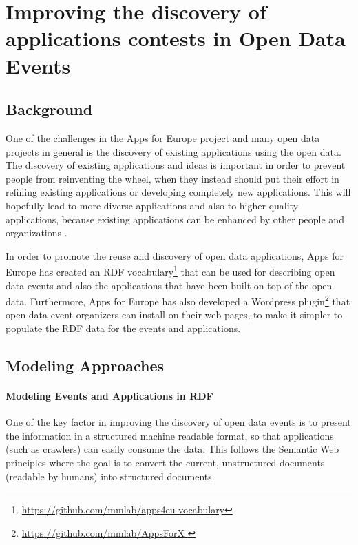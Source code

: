 \section{Improving the discovery of applications contests in Open Data Events}
\label{sec:contests}

\subsection{Background}
\label{sec:backcontest}
One of the challenges in the Apps for Europe project and many open data projects in general is the discovery of existing applications using the open data. The discovery of existing applications and ideas is important in order to prevent people from reinventing the wheel, when they instead should put their effort in refining existing applications or developing completely new applications. This will hopefully lead to more diverse applications and also to higher quality applications, because existing applications can be enhanced by other people and organizations \cite{apps4eu}.

In order to promote the reuse and discovery of open data applications, Apps for Europe has created an RDF vocabulary\footnote{\url{https://github.com/mmlab/apps4eu-vocabulary}}  that can be used for describing open data events and also the applications that have been built on top of the open data. Furthermore, Apps for Europe has also developed a Wordpress plugin\footnote{\url{https://github.com/mmlab/AppsForX }}  that open data event organizers can install on their web pages, to make it simpler to populate the RDF data for the events and applications.

\subsection{Modeling Approaches}
\label{sec:modeleventsapps}

\paragraph{Modeling Events and Applications in RDF}
\label{sec:modeleventrdf}

One of the key factor in improving the discovery of open data events is to present the information in a structured machine readable format, so that applications (such as crawlers) can easily consume the data. This follows the Semantic Web principles where the goal is to convert the current, unstructured documents (readable by humans) into structured documents.

